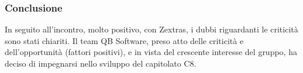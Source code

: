 	\subsubsection{Conclusione}
		In seguito all'incontro, molto positivo, con Zextras, i dubbi riguardanti le criticità sono stati chiariti. Il team QB Software, preso atto delle criticità e dell'opportunità (fattori positivi), e in vista del crescente interesse del gruppo, ha deciso di impegnarsi nello sviluppo del capitolato C8.